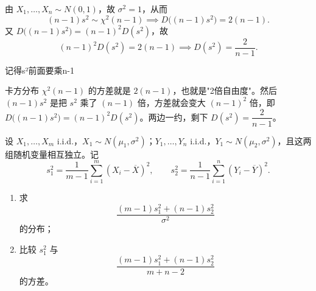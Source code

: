 \begin{solution}
由 \(X_1,\ldots,X_n\sim N(0,1)\)，故 \(\sigma^2=1\)，从而
\[
(n-1)s^2\sim\chi^2(n-1)\implies D\bigl((n-1)s^2\bigr)=2(n-1).
\]
又 \(D\bigl((n-1)s^2\bigr)=(n-1)^2D(s^2)\)，故
\[
(n-1)^2D(s^2)=2(n-1)\implies \boxed{D(s^2)=\frac{2}{n-1}}.
\]
\end{solution}
\begin{dxtips}
    记得s²前面要乘n-1
\end{dxtips}
\begin{dxtips}
卡方分布 $\chi^2(n-1)$ 的方差就是 $2(n-1)$，也就是"2倍自由度"。然后 $(n-1)s^2$ 是把 $s^2$ 乘了 $(n-1)$ 倍，方差就会变大 $(n-1)^2$ 倍，即 $D\big((n-1)s^2\big)=(n-1)^2D(s^2)$。两边一约，剩下 $D(s^2)=\dfrac{2}{n-1}$。
\end{dxtips}
\begin{homework}[2.4第2题]
设 \(X_1,\ldots,X_m\) i.i.d.，\(X_1\sim N(\mu_1,\sigma^2)\)；\(Y_1,\ldots,Y_n\) i.i.d.，\(Y_1\sim N(\mu_2,\sigma^2)\)，且这两组随机变量相互独立。记
\[
s_1^2=\frac{1}{m-1}\sum_{i=1}^m (X_i-\overline{X})^2,\qquad
s_2^2=\frac{1}{n-1}\sum_{i=1}^n (Y_i-\overline{Y})^2.
\]
\begin{enumerate}
    \item 求
    \[
    \frac{(m-1)s_1^2+(n-1)s_2^2}{\sigma^2}
    \]
    的分布；
    \item 比较 \(s_1^2\) 与
    \[
    \frac{(m-1)s_1^2+(n-1)s_2^2}{m+n-2}
    \]
    的方差。
\end{enumerate}
\end{homework}

